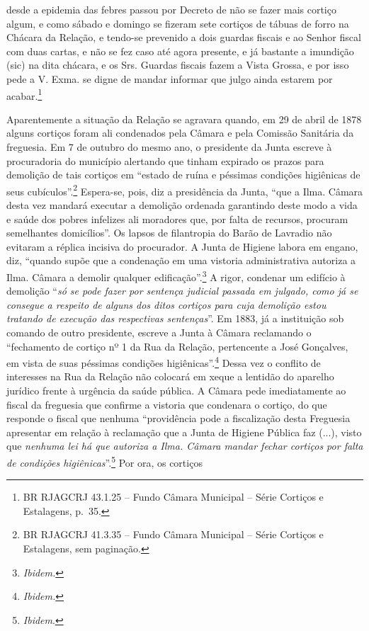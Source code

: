 desde a epidemia das febres passou por Decreto de não se fazer mais
cortiço algum, e como sábado e domingo se fizeram sete cortiços de
tábuas de forro na Chácara da Relação, e tendo-se prevenido a dois
guardas fiscais e ao Senhor fiscal com duas cartas, e não se fez caso
até agora presente, e já bastante a imundição (sic) na dita chácara, e
os Srs. Guardas fiscais fazem a Vista Grossa, e por isso pede a V. Exma.
se digne de mandar informar que julgo ainda estarem por
acabar.\footnote{BR RJAGCRJ 43.1.25 -- Fundo Câmara Municipal -- Série
  Cortiços e Estalagens, p.~35.}

Aparentemente a situação da Relação se agravara quando, em 29 de abril
de 1878 alguns cortiços foram ali condenados pela Câmara e pela Comissão
Sanitária da freguesia. Em 7 de outubro do mesmo ano, o presidente da
Junta escreve à procuradoria do município alertando que tinham expirado
os prazos para demolição de tais cortiços em ``estado de ruína e
péssimas condições higiênicas de seus cubículos''.\footnote{BR RJAGCRJ
  41.3.35 -- Fundo Câmara Municipal -- Série Cortiços e Estalagens, sem
  paginação.} Espera-se, pois, diz a presidência da Junta, ``que a Ilma.
Câmara desta vez mandará executar a demolição ordenada garantindo deste
modo a vida e saúde dos pobres infelizes ali moradores que, por falta de
recursos, procuram semelhantes domicílios''. Os lapsos de filantropia do
Barão de Lavradio não evitaram a réplica incisiva do procurador. A Junta
de Higiene labora em engano, diz, ``quando supõe que a condenação em uma
vistoria administrativa autoriza a Ilma. Câmara a demolir qualquer
edificação''.\footnote{\emph{Ibidem.}} A rigor, condenar um edifício à
demolição ``\emph{só se pode fazer por sentença judicial passada em
julgado, como já se consegue a respeito de alguns dos ditos cortiços
para cuja demolição estou tratando de execução das respectivas
sentenças}''. Em 1883, já a instituição sob comando de outro presidente,
escreve a Junta à Câmara reclamando o ``fechamento de cortiço nº 1 da
Rua da Relação, pertencente a José Gonçalves, em vista de suas péssimas
condições higiênicas''.\footnote{\emph{Ibidem.}} Dessa vez o conflito de
interesses na Rua da Relação não colocará em xeque a lentidão do
aparelho jurídico frente à urgência da saúde pública. A Câmara pede
imediatamente ao fiscal da freguesia que confirme a vistoria que
condenara o cortiço, do que responde o fiscal que nenhuma ``providência
pode a fiscalização desta Freguesia apresentar em relação à reclamação
que a Junta de Higiene Pública faz (...), visto que \emph{nenhuma lei há
que autoriza a Ilma. Câmara mandar fechar cortiços por falta de
condições higiênicas}''.\footnote{\emph{Ibidem}.} Por ora, os cortiços
